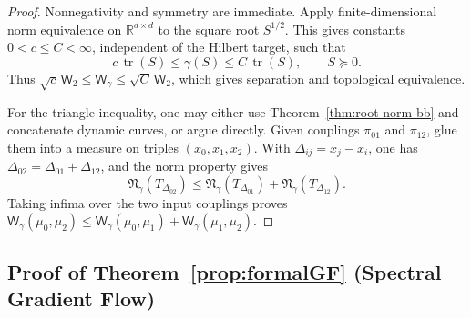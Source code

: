 \documentclass{article}
\newcommand{\R}{\mathbb{R}}
\newcommand{\Wtwo}{\mathsf{W}_2}
\newcommand{\Wg}{\mathsf{W}_{\gamma}}
\newcommand{\tr}{\operatorname{tr}}
\begin{document}
\begin{proof}
Nonnegativity and symmetry are immediate. Apply finite-dimensional norm
equivalence on $\R^{d\times d}$ to the square root $S^{1/2}$. This gives
constants $0<c\le C<\infty$, independent of the Hilbert target, such that
$$
    c\,\tr(S)\le \gamma(S)\le C\,\tr(S),
    \qquad S\succeq0.
$$
Thus $\sqrt c\,\Wtwo\le\Wg\le\sqrt C\,\Wtwo$, which gives separation and
topological equivalence.

For the triangle inequality, one may either use
Theorem~\ref{thm:root-norm-bb} and concatenate dynamic curves, or argue
directly.  Given couplings $\pi_{01}$ and $\pi_{12}$, glue them into a measure
on triples $(x_0,x_1,x_2)$.  With $\Delta_{ij}=x_j-x_i$, one has
$\Delta_{02}=\Delta_{01}+\Delta_{12}$, and the norm property gives
$$
    \mathfrak N_\gamma(T_{\Delta_{02}})
    \le
    \mathfrak N_\gamma(T_{\Delta_{01}})
    +
    \mathfrak N_\gamma(T_{\Delta_{12}}).
$$
Taking infima over the two input couplings proves
$\Wg(\mu_0,\mu_2)\le \Wg(\mu_0,\mu_1)+\Wg(\mu_1,\mu_2)$.
\end{proof}

\subsection{Proof of Theorem~\ref{prop:formalGF} (Spectral Gradient Flow)}
\label{sec:proof-formal-gamma-flow}
\end{document}
